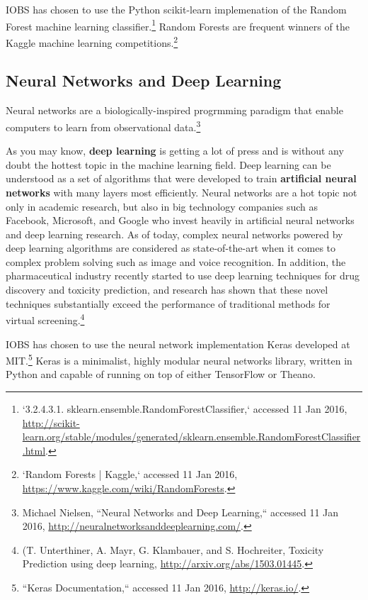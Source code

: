 \documentclass{article}
\begin{document}
IOBS has chosen to use the Python scikit-learn implemenation of the Random Forest machine learning classifier.\footnote{`3.2.4.3.1. sklearn.ensemble.RandomForestClassifier,` accessed 11 Jan 2016, \url{http://scikit-learn.org/stable/modules/generated/sklearn.ensemble.RandomForestClassifier.html}.}
Random Forests are frequent winners of the Kaggle machine learning competitions.\footnote{`Random Forests | Kaggle,` accessed 11 Jan 2016, \url{https://www.kaggle.com/wiki/RandomForests}.}




\subsection{Neural Networks and Deep Learning}

Neural networks are a biologically-inspired progrmming paradigm that enable computers to learn from observational data.\footnote{Michael Nielsen, ``Neural Networks and Deep Learning,`` accessed 11 Jan 2016, \url{http://neuralnetworksanddeeplearning.com/}.}


As you may know, \textbf{deep learning} is getting a lot of press and is without any doubt the hottest topic in the machine learning field. Deep learning can be understood as a set of algorithms that were developed to train \textbf{artificial neural networks} with many layers most efficiently.
 Neural networks are a hot topic not only in academic research, but also in big technology companies such as Facebook, Microsoft, and Google who invest heavily in artificial neural networks and deep learning research. As of today, complex neural networks powered by deep learning algorithms are considered as state-of-the-art when it comes to complex problem solving such as image and voice recognition.
In addition, the pharmaceutical industry recently started to use deep learning techniques for drug discovery and toxicity prediction, and research has shown that these novel techniques substantially exceed the performance of traditional methods for virtual screening.\footnote{ (T. Unterthiner, A. Mayr, G. Klambauer, and S. Hochreiter, Toxicity Prediction using deep learning, 
\url{http://arxiv.org/abs/1503.01445}.}

IOBS has chosen to use the neural network implementation Keras developed at MIT.\footnote{``Keras Documentation,`` accessed 11 Jan 2016, \url{http://keras.io/}.}
Keras is a minimalist, highly modular neural networks library, written in Python and capable of running on top of either TensorFlow or Theano.
\end{document}
